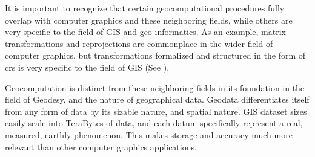 It is important to recognize that certain geocomputational procedures fully overlap with computer graphics and these neighboring fields, while others are very specific to the field of GIS and geo-informatics.
As an example, matrix transformations and reprojections are commonplace in the wider field of computer graphics, but transformations formalized and structured in the form of \ac*{crs} is very specific to the field of GIS (See ).

Geocomputation is distinct from these neighboring fields in its foundation in the field of Geodesy, and the nature of geographical data. 
Geodata differentiates itself from any form of data by its sizable nature, and spatial nature. 
GIS dataset sizes easily scale into TeraBytes of data, and each datum specifically represent a real, measured, earthly phenomenon.
This makes storage and accuracy much more relevant than other computer graphics applications. 





